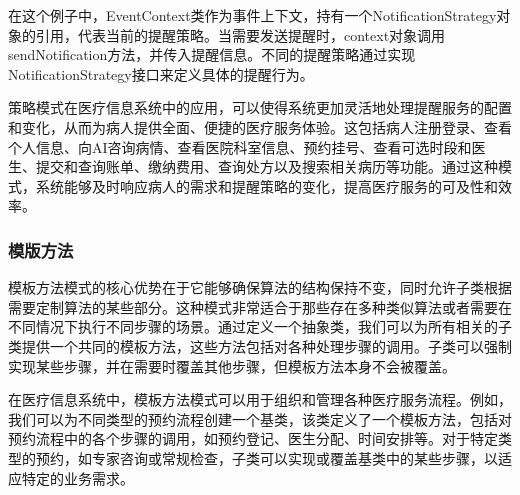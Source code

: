 在这个例子中，EventContext类作为事件上下文，持有一个NotificationStrategy对象的引用，代表当前的提醒策略。当需要发送提醒时，context对象调用sendNotification方法，并传入提醒信息。不同的提醒策略通过实现NotificationStrategy接口来定义具体的提醒行为。

策略模式在医疗信息系统中的应用，可以使得系统更加灵活地处理提醒服务的配置和变化，从而为病人提供全面、便捷的医疗服务体验。这包括病人注册登录、查看个人信息、向AI咨询病情、查看医院科室信息、预约挂号、查看可选时段和医生、提交和查询账单、缴纳费用、查询处方以及搜索相关病历等功能。通过这种模式，系统能够及时响应病人的需求和提醒策略的变化，提高医疗服务的可及性和效率。

\subsubsection{模版方法}
模板方法模式的核心优势在于它能够确保算法的结构保持不变，同时允许子类根据需要定制算法的某些部分。这种模式非常适合于那些存在多种类似算法或者需要在不同情况下执行不同步骤的场景。通过定义一个抽象类，我们可以为所有相关的子类提供一个共同的模板方法，这些方法包括对各种处理步骤的调用。子类可以强制实现某些步骤，并在需要时覆盖其他步骤，但模板方法本身不会被覆盖。

在医疗信息系统中，模板方法模式可以用于组织和管理各种医疗服务流程。例如，我们可以为不同类型的预约流程创建一个基类，该类定义了一个模板方法，包括对预约流程中的各个步骤的调用，如预约登记、医生分配、时间安排等。对于特定类型的预约，如专家咨询或常规检查，子类可以实现或覆盖基类中的某些步骤，以适应特定的业务需求。

